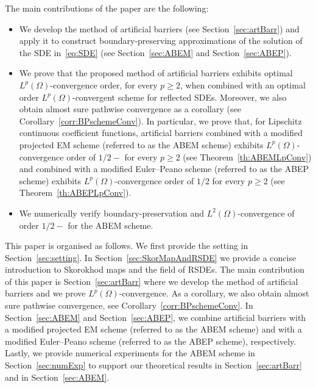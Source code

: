 \documentclass[11pt]{amsart}
\begin{document}
{The main contributions of the paper are the following:
\begin{itemize}
\item We develop the method of artificial barriers (see Section~\ref{sec:artBarr}) and apply it to construct boundary-preserving approximations of the solution of the SDE in~\eqref{eq:SDE} (see Section~\ref{sec:ABEM} and Section~\ref{sec:ABEP}).
\item We prove that the proposed method of artificial barriers exhibits optimal $L^{p}(\Omega)$-convergence order, for every $p \geq 2$, when combined with an optimal order $L^{p}(\Omega)$-convergent scheme for reflected SDEs. Moreover, we also obtain almost sure pathwise convergence as a corollary (see Corollary~\ref{corr:BPschemeConv}). In particular, we prove that, for Lipschitz continuous coefficient functions, artificial barriers combined with a modified projected EM scheme (referred to as the ABEM scheme) exhibits $L^{p}(\Omega)$-convergence order of $1/2-$ for every $p \geq 2$ (see Theorem~\ref{th:ABEMLpConv}) and combined with a modified Euler--Peano scheme (referred to as the ABEP scheme) exhibits $L^{p}(\Omega)$-convergence order of $1/2$ for every $p \geq 2$ (see Theorem~\ref{th:ABEPLpConv}).
\item We numerically verify boundary-preservation and $L^{2}(\Omega)$-convergence of order $1/2-$ for the ABEM scheme.
\end{itemize}

This paper is organised as follows. We first provide the setting in Section~\ref{sec:setting}. In Section~\ref{sec:SkorMapAndRSDE} we provide a concise introduction to Skorokhod maps and the field of RSDEs. The main contribution of this paper is Section~\ref{sec:artBarr} where we develop the method of artificial barriers and we prove $L^{p}(\Omega)$-convergence. As a corollary, we also obtain almost sure pathwise convergence, see Corollary~\ref{corr:BPschemeConv}. In Section~\ref{sec:ABEM} and Section~\ref{sec:ABEP}, we combine artificial barriers with a modified projected EM scheme (referred to as the ABEM scheme) and with a modified Euler--Peano scheme (referred to as the ABEP scheme), respectively. Lastly, we provide numerical experiments for the ABEM scheme in Section~\ref{sec:numExp} to support our theoretical results in Section~\ref{sec:artBarr} and in Section~\ref{sec:ABEM}.

}
\end{document}
